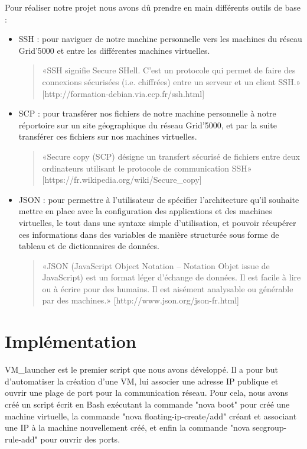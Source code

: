 \documentclass{report}
\begin{document}
    Pour réaliser notre projet nous avons dû prendre en main différents outils de base :
    \begin{itemize}
        \item SSH : pour naviguer de notre machine personnelle vers les machines du réseau Grid'5000 et entre les différentes machines virtuelles.
        \begin{quote}
            «SSH signifie Secure SHell. C'est un protocole qui permet de faire des connexions sécurisées (i.e. chiffrées) entre un serveur et un client SSH.»
            [http://formation-debian.via.ecp.fr/ssh.html]
        \end{quote}
        \item SCP : pour transférer nos fichiers de notre machine personnelle à notre réportoire sur un site géographique du réseau Grid'5000, et par la suite transférer ces fichiers sur nos machines virtuelles.
        \begin{quote}
            «Secure copy (SCP) désigne un transfert sécurisé de fichiers entre deux ordinateurs utilisant le protocole de communication SSH»
            [https://fr.wikipedia.org/wiki/Secure\_copy]
        \end{quote}
        \item JSON : pour permettre à l'utilisateur de spécifier l'architecture qu'il souhaite mettre en place avec la configuration des applications et des machines virtuelles, le tout dans une syntaxe simple d'utilisation, et pouvoir récupérer ces informations dans des variables de manière structurée sous forme de tableau et de dictionnaires de données.
        \begin{quote}
            «JSON (JavaScript Object Notation – Notation Objet issue de JavaScript) est un format léger d'échange de données. Il est facile à lire ou à écrire pour des humains. Il est aisément analysable ou générable par des machines.»
            [http://www.json.org/json-fr.html]
        \end{quote}
    \end{itemize}


    \section{Implémentation}



VM\_launcher est le premier script que nous avons développé. Il a pour but d'automatiser la création d'une VM, lui associer une adresse IP publique et ouvrir une plage de port pour la communication réseau. Pour cela, nous avons créé un script écrit en Bash exécutant la commande "nova boot" pour créé une machine virtuelle, la commande "nova floating-ip-create/add" créant et associant une IP à la machine nouvellement créé, et enfin la commande "nova secgroup-rule-add" pour ouvrir des ports.\bigbreak
\end{document}
